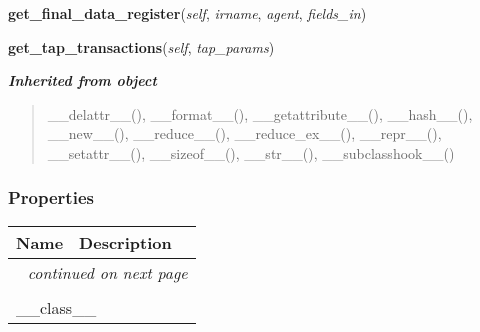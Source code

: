     \vspace{0.5ex}

\hspace{.8\funcindent}\begin{boxedminipage}{\funcwidth}

    \raggedright \textbf{get\_final\_data\_register}(\textit{self}, \textit{irname}, \textit{agent}, \textit{fields\_in})

\setlength{\parskip}{2ex}
\setlength{\parskip}{1ex}
    \end{boxedminipage}

    \label{hpl_tap_dfx_api:HplTapDfxApi:get_tap_transactions}

    \vspace{0.5ex}

\hspace{.8\funcindent}\begin{boxedminipage}{\funcwidth}

    \raggedright \textbf{get\_tap\_transactions}(\textit{self}, \textit{tap\_params})

\setlength{\parskip}{2ex}
\setlength{\parskip}{1ex}
    \end{boxedminipage}


\large{\textbf{\textit{Inherited from object}}}

\begin{quote}
\_\_delattr\_\_(), \_\_format\_\_(), \_\_getattribute\_\_(), \_\_hash\_\_(), \_\_new\_\_(), \_\_reduce\_\_(), \_\_reduce\_ex\_\_(), \_\_repr\_\_(), \_\_setattr\_\_(), \_\_sizeof\_\_(), \_\_str\_\_(), \_\_subclasshook\_\_()
\end{quote}


  \subsubsection{Properties}

    \vspace{-1cm}
\hspace{\varindent}\begin{longtable}{|p{\varnamewidth}|p{\vardescrwidth}|l}
\cline{1-2}
\cline{1-2} \centering \textbf{Name} & \centering \textbf{Description}& \\
\cline{1-2}
\endhead\cline{1-2}\multicolumn{3}{r}{\small\textit{continued on next page}}\\\endfoot\cline{1-2}
\endlastfoot\multicolumn{2}{|l|}{\textit{Inherited from object}}\\
\multicolumn{2}{|p{\varwidth}|}{\raggedright \_\_class\_\_}\\
\cline{1-2}
\end{longtable}

